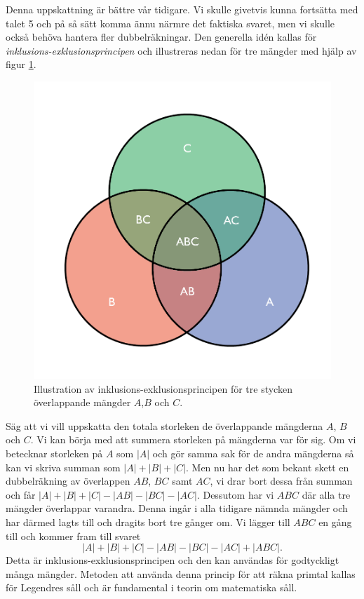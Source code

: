 Denna uppskattning är bättre vår tidigare. 
Vi skulle givetvis kunna fortsätta med talet 5 och på så sätt komma ännu närmre det faktiska svaret, 
men vi skulle också behöva hantera fler dubbelräkningar.
Den generella idén kallas för \textit{inklusions-exklusionsprincipen} och illustreras nedan för tre mängder med hjälp av figur \ref{pop.fig}.
\begin{figure}[H]
    \centering
    \includegraphics[scale=0.3]{erik/Images/Venndiagram.pdf}
    \caption{Illustration av inklusions-exklusionsprincipen för tre stycken överlappande mängder $A$,$B$ och $C$.}
    \label{pop.fig}
\end{figure}
Säg att vi vill uppskatta den totala storleken de överlappande mängderna $A$, $B$ och $C$. 
Vi kan börja med att summera storleken på mängderna var för sig.
Om vi betecknar storleken på $A$ som $|A|$ och gör samma sak för de andra mängderna så kan vi skriva summan som $|A|+|B|+|C|$.
Men nu har det som bekant skett en dubbelräkning av överlappen $AB$, $BC$ samt $AC$, vi drar bort dessa från summan och får $|A|+|B|+|C|-|AB|-|BC|-|AC|$.
Dessutom har vi $ABC$ där alla tre mängder överlappar varandra.
Denna ingår i alla tidigare nämnda mängder och har därmed lagts till och dragits bort tre gånger om. 
Vi lägger till $ABC$ en gång till och kommer fram till svaret
\begin{equation*}
    |A|+|B|+|C|-|AB|-|BC|-|AC|+|ABC|.
\end{equation*}
Detta är inklusions-exklusionsprincipen och den kan användas för godtyckligt många mängder.
Metoden att använda denna princip för att räkna primtal kallas för Legendres såll och är fundamental i teorin om matematiska såll.


